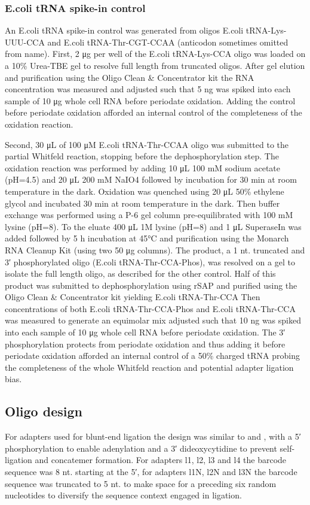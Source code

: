 \documentclass[9pt,lineno]{elife}
\begin{document}
\subsubsection{E.coli tRNA spike-in control}
An E.coli tRNA spike-in control was generated from oligos E.coli tRNA-Lys-UUU-CCA and E.coli tRNA-Thr-CGT-CCAA (anticodon sometimes omitted from name).
First, 2 μg per well of the E.coli tRNA-Lys-CCA oligo was loaded on a 10\% Urea-TBE gel to resolve full length from truncated oligos.
After gel elution and purification using the Oligo Clean \& Concentrator kit the RNA concentration was measured and adjusted such that 5 ng was spiked into each sample of 10 μg whole cell RNA before periodate oxidation.
Adding the control before periodate oxidation afforded an internal control of the completeness of the oxidation reaction.

Second, 30 μL of 100 μM E.coli tRNA-Thr-CCAA oligo was submitted to the partial Whitfeld reaction, stopping before the dephosphorylation step.
The oxidation reaction was performed by adding 10 μL 100 mM sodium acetate (pH=4.5) and 20 μL 200 mM NaIO4 followed by incubation for 30 min at room temperature in the dark.
Oxidation was quenched using 20 μL 50\% ethylene glycol and incubated 30 min at room temperature in the dark.
Then buffer exchange was performed using a P-6 gel column pre-equilibrated with 100 mM lysine (pH=8).
To the eluate 400 μL 1M lysine (pH=8) and 1 μL SuperaseIn was added followed by 5 h incubation at 45°C and purification using the Monarch RNA Cleanup Kit (using two 50 μg columns).
The product, a 1 nt. truncated and 3′ phosphorylated oligo (E.coli tRNA-Thr-CCA-Phos), was resolved on a gel to isolate the full length oligo, as described for the other control.
Half of this product was submitted to dephosphorylation using rSAP and purified using the Oligo Clean \& Concentrator kit yielding E.coli tRNA-Thr-CCA
Then concentrations of both E.coli tRNA-Thr-CCA-Phos and E.coli tRNA-Thr-CCA was measured to generate an equimolar mix adjusted such that 10 ng was spiked into each sample of 10 μg whole cell RNA before periodate oxidation.
The 3′ phosphorylation protects from periodate oxidation and thus adding it before periodate oxidation afforded an internal control of a 50\% charged tRNA probing the completeness of the whole Whitfeld reaction and potential adapter ligation bias.



\subsection{Oligo design}
For adapters used for blunt-end ligation the design was similar to \cite{McGlincy2017-ro} and \cite{Behrens2021-gb}, with a 5′ phosphorylation to enable adenylation and a 3′ dideoxycytidine to prevent self-ligation and concatemer formation.
For adapters l1, l2, l3 and l4 the barcode sequence was 8 nt. starting at the 5′, for adapters l1N, l2N and l3N the barcode sequence was truncated to 5 nt. to make space for a preceding six random nucleotides to diversify the sequence context engaged in ligation.
\end{document}
